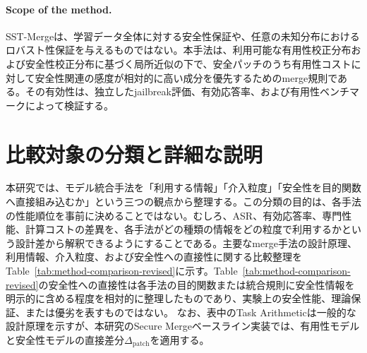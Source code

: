 \documentclass{article}
\begin{document}
\paragraph{Scope of the method.}
SST-Mergeは、学習データ全体に対する安全性保証や、任意の未知分布におけるロバスト性保証を与えるものではない。本手法は、利用可能な有用性校正分布および安全性校正分布に基づく局所近似の下で、安全パッチのうち有用性コストに対して安全性関連の感度が相対的に高い成分を優先するためのmerge規則である。その有効性は、独立したjailbreak評価、有効応答率、および有用性ベンチマークによって検証する。

\section{比較対象の分類と詳細な説明}
\label{app:method-taxonomy-and-details}

本研究では、モデル統合手法を「利用する情報」「介入粒度」「安全性を目的関数へ直接組み込むか」という三つの観点から整理する。この分類の目的は、各手法の性能順位を事前に決めることではない。むしろ、ASR、有効応答率、専門性能、計算コストの差異を、各手法がどの種類の情報をどの粒度で利用するかという設計差から解釈できるようにすることである。主要なmerge手法の設計原理、利用情報、介入粒度、および安全性への直接性に関する比較整理をTable~\ref{tab:method-comparison-revised}に示す。Table~\ref{tab:method-comparison-revised}の安全性への直接性は各手法の目的関数または統合規則に安全性情報を明示的に含める程度を相対的に整理したものであり、実験上の安全性能、理論保証、または優劣を表すものではない。
なお、表中のTask Arithmeticは一般的な設計原理を示すが、本研究のSecure Mergeベースライン実装では、有用性モデルと安全性モデルの直接差分\(\Delta_{\mathrm{patch}}\)を適用する。
\end{document}
